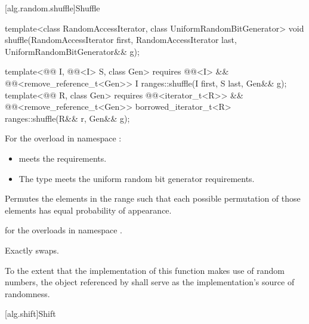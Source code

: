 [alg.random.shuffle]{Shuffle}

%
\begin{itemdecl}
template<class RandomAccessIterator, class UniformRandomBitGenerator>
  void shuffle(RandomAccessIterator first,
               RandomAccessIterator last,
               UniformRandomBitGenerator&& g);

template<@@ I, @@<I> S, class Gen>
  requires @@<I> &&
           @@<remove_reference_t<Gen>>
  I ranges::shuffle(I first, S last, Gen&& g);
template<@@ R, class Gen>
  requires @@<iterator_t<R>> &&
           @@<remove_reference_t<Gen>>
  borrowed_iterator_t<R> ranges::shuffle(R&& r, Gen&& g);
\end{itemdecl}

\begin{itemdescr}
\pnum
\expects
For the overload in namespace :
\begin{itemize}
\item
   meets
  the  requirements.
\item
  The type  meets
  the uniform random bit generator requirements.
\end{itemize}

\pnum
\effects
Permutes the elements in the range 
such that each possible permutation of those elements
has equal probability of appearance.

\pnum
\returns
{} for the overloads in namespace .

\pnum
\complexity
Exactly  swaps.

\pnum
\remarks
To the extent that the implementation of this function makes use
of random numbers, the object referenced by  shall serve as
the implementation's source of randomness.
\end{itemdescr}

[alg.shift]{Shift}

